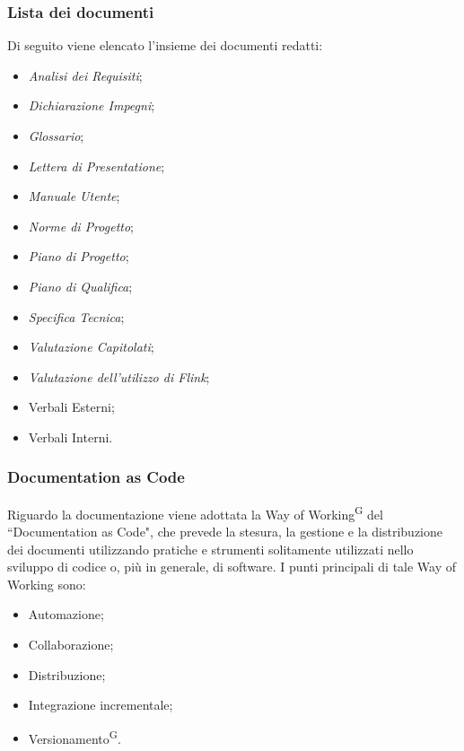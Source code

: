 \documentclass[8pt]{article}
\newcommand{\glossterm}[1]{#1\textsuperscript{G}} %
\begin{document}
\subsubsection{Lista dei documenti}
Di seguito viene elencato l'insieme dei documenti redatti:
\begin{itemize}
    \item \textit{Analisi dei Requisiti};
    \item \textit{Dichiarazione Impegni};
    \item \textit{Glossario};
    \item \textit{Lettera di Presentatione};
    \item \textit{Manuale Utente};
    \item \textit{Norme di Progetto};
    \item \textit{Piano di Progetto};
    \item \textit{Piano di Qualifica};
    \item \textit{Specifica Tecnica};
    \item \textit{Valutazione Capitolati};
    \item \textit{Valutazione dell'utilizzo di Flink};
    \item Verbali Esterni;
    \item Verbali Interni.
\end{itemize}

\subsubsection{Documentation as Code}
Riguardo la documentazione viene adottata la \glossterm{Way of Working} del ``Documentation as
Code", che prevede la stesura, la gestione e la distribuzione dei documenti utilizzando pratiche e strumenti solitamente utilizzati nello sviluppo di codice o, più in generale, di software. I punti principali di tale Way of Working sono:
\begin{itemize}
    \item Automazione;
    \item Collaborazione;
    \item Distribuzione;
    \item Integrazione incrementale;
    \item \glossterm{Versionamento}.
\end{itemize}
\end{document}

